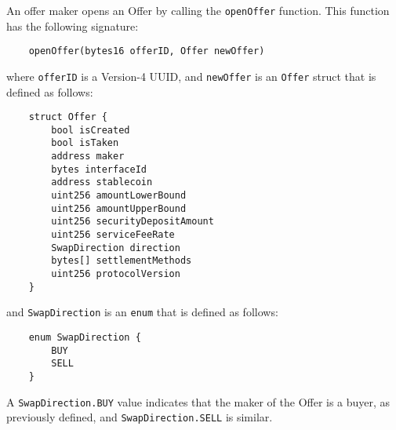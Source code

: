 \documentclass[11pt]{article}
\begin{document}
    An offer maker opens an Offer by calling the \verb|openOffer| function.
    This function has the following signature:
    \begin{verbatim}
    openOffer(bytes16 offerID, Offer newOffer)
    \end{verbatim}
    where \verb|offerID| is a Version-4 UUID\cite{UUID}, and \verb|newOffer| is an \verb|Offer|
    struct that is defined as follows:
    \begin{verbatim}
    struct Offer {
        bool isCreated
        bool isTaken
        address maker
        bytes interfaceId
        address stablecoin
        uint256 amountLowerBound
        uint256 amountUpperBound
        uint256 securityDepositAmount
        uint256 serviceFeeRate
        SwapDirection direction
        bytes[] settlementMethods
        uint256 protocolVersion
    }
    \end{verbatim}
    and \verb|SwapDirection| is an \verb|enum| that is defined as follows:
    \begin{verbatim}
    enum SwapDirection {
        BUY
        SELL
    }
    \end{verbatim}
    A \verb|SwapDirection.BUY| value indicates that the maker of the Offer is a buyer, as previously
    defined, and \verb|SwapDirection.SELL| is similar.
\end{document}
